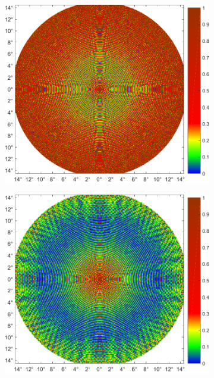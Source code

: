 \begin{figure} %
	\centering
	\begin{subfigure}[b]{0.48\textwidth}
		\includegraphics[width=\textwidth]{images/fig_sim_relerror_FTproj-r100-bd1e-3.pdf}
	\end{subfigure}\hfill
	\begin{subfigure}[b]{0.48\textwidth}
		\includegraphics[width=\textwidth]{images/fig_sim_relerror_msft-r100-bd1e-3.pdf}

\end{subfigure}
\end{figure}
